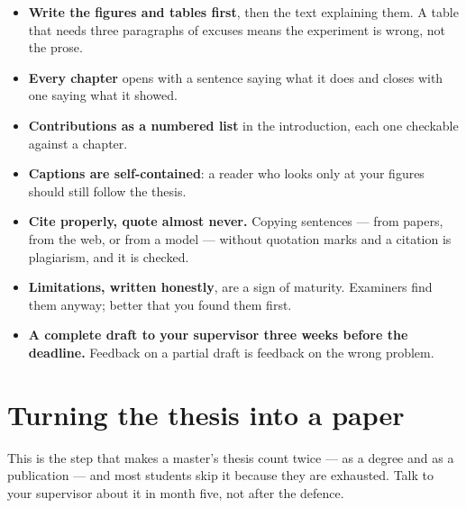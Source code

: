 \documentclass[11pt,a4paper]{article}
\begin{document}
\begin{itemize}
  \item \textbf{Write the figures and tables first}, then the text explaining
        them. A table that needs three paragraphs of excuses means the
        experiment is wrong, not the prose.
  \item \textbf{Every chapter} opens with a sentence saying what it does and
        closes with one saying what it showed.
  \item \textbf{Contributions as a numbered list} in the introduction, each
        one checkable against a chapter.
  \item \textbf{Captions are self-contained}: a reader who looks only at your
        figures should still follow the thesis.
  \item \textbf{Cite properly, quote almost never.} Copying sentences --- from
        papers, from the web, or from a model --- without quotation marks and
        a citation is plagiarism, and it is checked.
  \item \textbf{Limitations, written honestly}, are a sign of maturity.
        Examiners find them anyway; better that you found them first.
  \item \textbf{A complete draft to your supervisor three weeks before the
        deadline.} Feedback on a partial draft is feedback on the wrong
        problem.
\end{itemize}

\section{Turning the thesis into a paper}

This is the step that makes a master's thesis count twice --- as a degree and
as a publication --- and most students skip it because they are exhausted.
Talk to your supervisor about it in month five, not after the defence.
\end{document}

